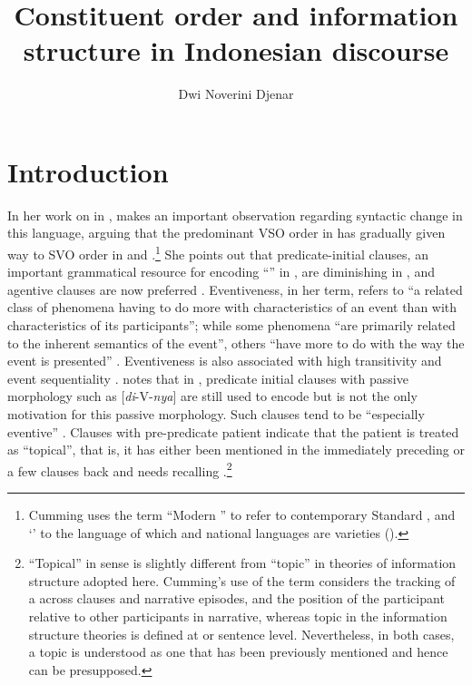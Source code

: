 \documentclass[output=paper
,modfonts
,nonflat]{langsci/langscibook}
\title{Constituent order and information structure in Indonesian discourse}
\author{Dwi Noverini Djenar\affiliation{The University of Sydney}}
\begin{document}
\maketitle

\section{\label{s:djenar:1}Introduction}

In her work on  in , \citet{Cumming1991} makes an important observation regarding syntactic change in this language, arguing that the predominant VSO order in  has gradually given way to SVO order in  and .\footnote{Cumming uses the term “Modern ” to refer to contemporary Standard , and ‘’ to the language of which  and  national languages are varieties (\citeyear[2]{Cumming1991}).}  She points out that predicate-initial clauses, an important grammatical resource for encoding “” in , are diminishing in , and agentive clauses are now preferred \citep[199]{Cumming1991}. Eventiveness, in her term, refers to “a related class of phenomena having to do more with characteristics of an event than with characteristics of its participants”; while some phenomena “are primarily related to the inherent semantics of the event”, others “have more to do with the way the event is presented” \citep[123]{Cumming1991}. Eventiveness is also associated with high  transitivity and event sequentiality \citep[161--162]{Cumming1991}. \citet[176]{Cumming1991} notes that in , predicate initial clauses with passive morphology such as [\textit{di}-V-\textit{nya}] are still used to encode  but  is not the only motivation for this passive morphology. Such clauses tend to be “especially eventive” \citep[176]{Cumming1991}. Clauses with pre-predicate patient indicate that the patient is treated as “topical”, that is, it has either been mentioned in the immediately preceding  or a few clauses back and needs recalling \citep[176]{Cumming1991}.\footnote{“Topical” in  sense is slightly different from “topic” in theories of information structure adopted here. Cumming’s use of the term considers the tracking of a  across clauses and narrative episodes, and the position of the participant relative to other participants in narrative, whereas topic in the information structure theories is defined at  or sentence level. Nevertheless, in both cases, a topic  is understood as one that has been previously mentioned and hence can be presupposed.}  
\end{document}
